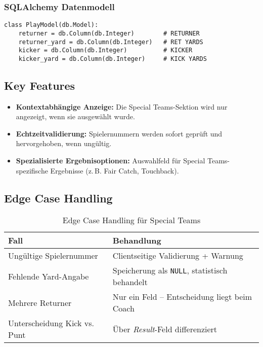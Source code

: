 \documentclass[12pt]{article}
\begin{document}
\subsubsection{SQLAlchemy Datenmodell}

\begin{verbatim}
class PlayModel(db.Model):
    returner = db.Column(db.Integer)        # RETURNER
    returner_yard = db.Column(db.Integer)   # RET YARDS
    kicker = db.Column(db.Integer)          # KICKER
    kicker_yard = db.Column(db.Integer)     # KICK YARDS
\end{verbatim}

\subsection{Key Features}

\begin{itemize}
  \item \textbf{Kontextabhängige Anzeige:} Die Special Teams-Sektion wird nur angezeigt, wenn sie ausgewählt wurde.
  \item \textbf{Echtzeitvalidierung:} Spielernummern werden sofort geprüft und hervorgehoben, wenn ungültig.
  \item \textbf{Spezialisierte Ergebnisoptionen:} Auswahlfeld für Special Teams-spezifische Ergebnisse (z.\,B. Fair Catch, Touchback).
\end{itemize}


\subsection{Edge Case Handling}

\begin{table}[h!]
\centering
\begin{tabular}{|l|p{10cm}|}
\hline
\textbf{Fall} & \textbf{Behandlung} \\
\hline
Ungültige Spielernummer & Clientseitige Validierung + Warnung \\
Fehlende Yard-Angabe & Speicherung als \texttt{NULL}, statistisch behandelt \\
Mehrere Returner & Nur ein Feld – Entscheidung liegt beim Coach \\
Unterscheidung Kick vs. Punt & Über \textit{Result}-Feld differenziert \\
\hline
\end{tabular}
\caption{Edge Case Handling für Special Teams}
\end{table}
\end{document}
